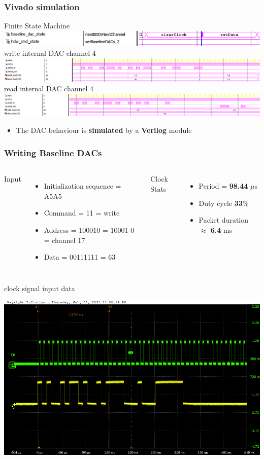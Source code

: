 \documentclass[aspectratio=169]{beamer}
\begin{document}
	\begin{frame}
	\frametitle{Vivado simulation}
		\begin{center}
			Finite State Machine
			\includegraphics[width=0.9 \textwidth]{IMG/Simulation1.png}
			\newline
			write internal DAC channel 4
			\includegraphics[width=0.9 \textwidth]{IMG/Simulation3.png}
			\newline
			read internal DAC channel 4
			\includegraphics[width=0.9 \textwidth]{IMG/Simulation4.png}
		\end{center}
	\begin{itemize}
		\item The DAC behaviour is \textbf{simulated} by a \textbf{Verilog} module
	\end{itemize}
	\end{frame}

	
	\begin{frame}
	\frametitle{Writing Baseline DACs}
	\begin{columns}
		\column{0.5 \textwidth}
	{\color{blue} Input}
	\begin{itemize}
		\item Initialization sequence = A5A5
		\item Command = 11 = write
		\item Address = 100010 = 10001-0 = channel 17
		\item Data    = 00111111 = 63
	\end{itemize}
	\column{0.5 \textwidth}
	{\color{blue} Clock Stats}
	\begin{itemize}
		\item Period = \textbf{98.44} $\mu$s
		\item Duty cycle \textbf{33}\%
		\item Packet duration $\approx$ \textbf{6.4} ms
	\end{itemize}
	\end{columns}
	\begin{center}
		{\color{green} clock signal}
		{\color{yellow} input data}
	\end{center}
	\begin{center}
		\includegraphics[width=0.5 \textwidth]{IMG/probe/09-08-2021_ch17-write63-baselinedac1.png}
	\end{center}
	\end{frame}
\end{document}
